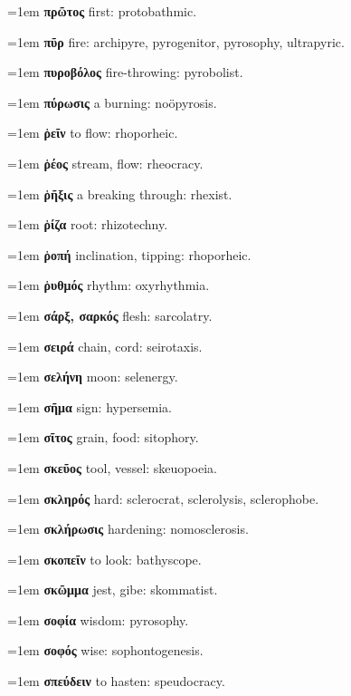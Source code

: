 \hangindent=1em \textbf{πρῶτος} first: protobathmic.\par
\hangindent=1em \textbf{πῦρ} fire: archipyre, pyrogenitor, pyrosophy, ultrapyric.\par
\hangindent=1em \textbf{πυροβόλος} fire-throwing: pyrobolist.\par
\hangindent=1em \textbf{πύρωσις} a burning: noöpyrosis.\par
\hangindent=1em \textbf{ῥεῖν} to flow: rhoporheic.\par
\hangindent=1em \textbf{ῥέος} stream, flow: rheocracy.\par
\hangindent=1em \textbf{ῥῆξις} a breaking through: rhexist.\par
\hangindent=1em \textbf{ῥίζα} root: rhizotechny.\par
\hangindent=1em \textbf{ῥοπή} inclination, tipping: rhoporheic.\par
\hangindent=1em \textbf{ῥυθμός} rhythm: oxyrhythmia.\par
\hangindent=1em \textbf{σάρξ, σαρκός} flesh: sarcolatry.\par
\hangindent=1em \textbf{σειρά} chain, cord: seirotaxis.\par
\hangindent=1em \textbf{σελήνη} moon: selenergy.\par
\hangindent=1em \textbf{σῆμα} sign: hypersemia.\par
\hangindent=1em \textbf{σῖτος} grain, food: sitophory.\par
\hangindent=1em \textbf{σκεῦος} tool, vessel: skeuopoeia.\par
\hangindent=1em \textbf{σκληρός} hard: sclerocrat, sclerolysis, sclerophobe.\par
\hangindent=1em \textbf{σκλήρωσις} hardening: nomosclerosis.\par
\hangindent=1em \textbf{σκοπεῖν} to look: bathyscope.\par
\hangindent=1em \textbf{σκῶμμα} jest, gibe: skommatist.\par
\hangindent=1em \textbf{σοφία} wisdom: pyrosophy.\par
\hangindent=1em \textbf{σοφός} wise: sophontogenesis.\par
\hangindent=1em \textbf{σπεύδειν} to hasten: speudocracy.\par
